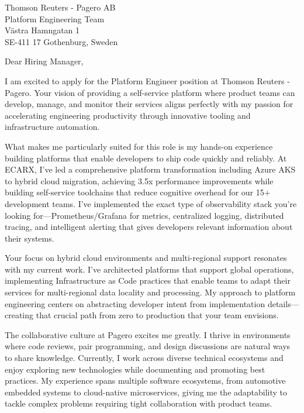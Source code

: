 \documentclass[a4paper,10pt]{article}
\begin{document}
\pagestyle{empty} %

\begin{letter}{\color{darkblue}
Thomson Reuters - Pagero AB\\
Platform Engineering Team\\
Västra Hamngatan 1\\
SE-411 17 Gothenburg, Sweden}

\vspace{30pt}

\opening{Dear Hiring Manager,}

\vspace{8pt}

I am excited to apply for the Platform Engineer position at Thomson Reuters - Pagero. Your vision of providing a self-service platform where product teams can develop, manage, and monitor their services aligns perfectly with my passion for accelerating engineering productivity through innovative tooling and infrastructure automation.

What makes me particularly suited for this role is my hands-on experience building platforms that enable developers to ship code quickly and reliably. At ECARX, I've led a comprehensive platform transformation including Azure AKS to hybrid cloud migration, achieving 3.5x performance improvements while building self-service toolchains that reduce cognitive overhead for our 15+ development teams. I've implemented the exact type of observability stack you're looking for—Prometheus/Grafana for metrics, centralized logging, distributed tracing, and intelligent alerting that gives developers relevant information about their systems.

Your focus on hybrid cloud environments and multi-regional support resonates with my current work. I've architected platforms that support global operations, implementing Infrastructure as Code practices that enable teams to adapt their services for multi-regional data locality and processing. My approach to platform engineering centers on abstracting developer intent from implementation details—creating that crucial path from zero to production that your team envisions.

The collaborative culture at Pagero excites me greatly. I thrive in environments where code reviews, pair programming, and design discussions are natural ways to share knowledge. Currently, I work across diverse technical ecosystems and enjoy exploring new technologies while documenting and promoting best practices. My experience spans multiple software ecosystems, from automotive embedded systems to cloud-native microservices, giving me the adaptability to tackle complex problems requiring tight collaboration with product teams.


\end{letter}
\end{document}
